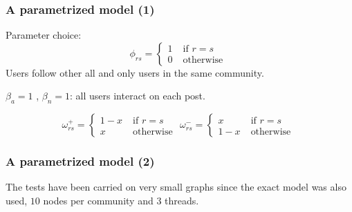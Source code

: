 \documentclass{beamer}
\begin{document}
\begin{frame}[c]
	\frametitle{A parametrized model (1)}
	Parameter choice:
	\begin{equation}
		\phi_{rs}  =
		\begin{cases}
			1 \; & \text{if } r = s  \\
			0 \; & \text{otherwise }
		\end{cases}
	\end{equation}
	Users follow other all and only users in the same community.

	\bigskip

	$\beta _{a} = 1$ , $\beta_{n} = 1 $: all users interact on each post.

	\begin{equation}
		\omega_{rs}^{+}   =
		\begin{cases}
			1 - x \; & \text{if } r = s  \\
			x \;     & \text{otherwise }
		\end{cases}
		\omega_{rs}^{-}   =
		\begin{cases}
			x \;     & \text{if } r = s  \\
			1 - x \; & \text{otherwise }
		\end{cases}
	\end{equation}
\end{frame}

\begin{frame}[c]
	\frametitle{A parametrized model (2)}

	The tests have been carried on very small graphs since the exact model was
	also used, $10$ nodes per community and $3$ threads.

\end{frame}
\end{document}
